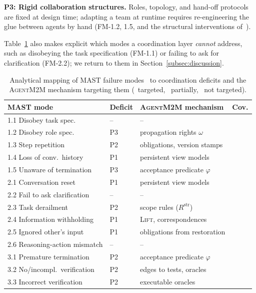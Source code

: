 \documentclass[10pt, anonymous, conference]{IEEEtran}
\newcommand{\cmark}{\ding{51}}
\newcommand{\xmark}{\ding{55}}
\newcommand{\pmark}{\ding{109}} %
\theoremstyle{definition}
\theoremstyle{plain}
\theoremstyle{remark}
\newcommand{\tool}{\textsc{AgentM2M}}
\newcommand{\str}{\mathrm{str}}
\begin{document}
\noindent\textbf{P3: Rigid collaboration structures.} Roles, topology, and
hand-off protocols are fixed at design time; adapting a team at runtime
requires re-engineering the glue between agents by hand (FM-1.2, 1.5, and the
structural interventions of~\cite{cemri2025mast}).

Table~\ref{tab:mast} also makes explicit which modes a coordination layer
\emph{cannot} address, such as disobeying the task specification (FM-1.1) or
failing to ask for clarification (FM-2.2); we return to them in
Section~\ref{subsec:discussion}.

\begin{table}[t]
\centering
\caption{Analytical mapping of MAST failure modes~\cite{cemri2025mast} to
coordination deficits and the \tool{} mechanism targeting them
(\cmark\ targeted, \pmark\ partially, \xmark\ not targeted).}
\label{tab:mast}
\footnotesize
\setlength{\tabcolsep}{3pt}
\begin{tabular}{@{}l l l c@{}}
\toprule
MAST mode & Deficit & \tool{} mechanism & Cov. \\
\midrule
1.1 Disobey task spec.        & --  & -- & \xmark \\
1.2 Disobey role spec.        & P3  & propagation rights $\omega$ & \pmark \\
1.3 Step repetition           & P2  & obligations, version stamps & \pmark \\
1.4 Loss of conv.\ history    & P1  & persistent view models & \cmark \\
1.5 Unaware of termination    & P3  & acceptance predicate $\varphi$ & \pmark \\
2.1 Conversation reset        & P1  & persistent view models & \cmark \\
2.2 Fail to ask clarification & --  & -- & \xmark \\
2.3 Task derailment           & P2  & scope rules ($R^{\str}$) & \pmark \\
2.4 Information withholding   & P1  & \textsc{Lift}, correspondences & \cmark \\
2.5 Ignored other's input     & P1  & obligations from restoration & \cmark \\
2.6 Reasoning-action mismatch & --  & -- & \xmark \\
3.1 Premature termination     & P2  & acceptance predicate $\varphi$ & \pmark \\
3.2 No/incompl.\ verification & P2 & edges to tests, oracles & \cmark \\
3.3 Incorrect verification    & P2  & executable oracles & \pmark \\
\bottomrule
\end{tabular}
\end{table}
\end{document}
